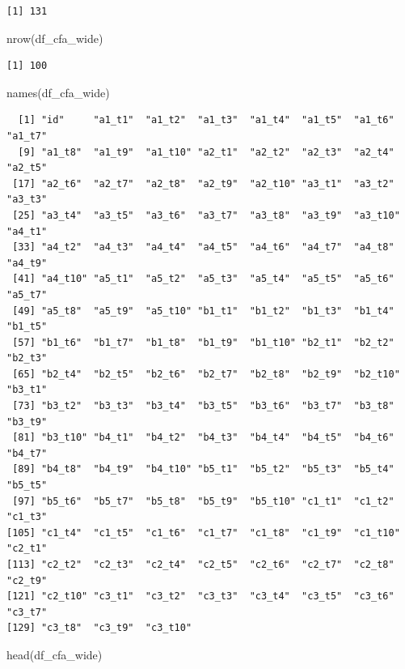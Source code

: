 \documentclass[
  letterpaper,
  DIV=11,
  numbers=noendperiod]{scrreprt}
\newenvironment{Shaded}{\begin{snugshade}}{\end{snugshade}}
\newcommand{\FunctionTok}[1]{\textcolor[rgb]{0.28,0.35,0.67}{#1}}
\newcommand{\NormalTok}[1]{\textcolor[rgb]{0.00,0.23,0.31}{#1}}
\begin{document}
\begin{verbatim}
[1] 131
\end{verbatim}

\begin{Shaded}
\begin{Highlighting}[]
\FunctionTok{nrow}\NormalTok{(df\_cfa\_wide)}
\end{Highlighting}
\end{Shaded}

\begin{verbatim}
[1] 100
\end{verbatim}

\begin{Shaded}
\begin{Highlighting}[]
\FunctionTok{names}\NormalTok{(df\_cfa\_wide)}
\end{Highlighting}
\end{Shaded}

\begin{verbatim}
  [1] "id"     "a1_t1"  "a1_t2"  "a1_t3"  "a1_t4"  "a1_t5"  "a1_t6"  "a1_t7" 
  [9] "a1_t8"  "a1_t9"  "a1_t10" "a2_t1"  "a2_t2"  "a2_t3"  "a2_t4"  "a2_t5" 
 [17] "a2_t6"  "a2_t7"  "a2_t8"  "a2_t9"  "a2_t10" "a3_t1"  "a3_t2"  "a3_t3" 
 [25] "a3_t4"  "a3_t5"  "a3_t6"  "a3_t7"  "a3_t8"  "a3_t9"  "a3_t10" "a4_t1" 
 [33] "a4_t2"  "a4_t3"  "a4_t4"  "a4_t5"  "a4_t6"  "a4_t7"  "a4_t8"  "a4_t9" 
 [41] "a4_t10" "a5_t1"  "a5_t2"  "a5_t3"  "a5_t4"  "a5_t5"  "a5_t6"  "a5_t7" 
 [49] "a5_t8"  "a5_t9"  "a5_t10" "b1_t1"  "b1_t2"  "b1_t3"  "b1_t4"  "b1_t5" 
 [57] "b1_t6"  "b1_t7"  "b1_t8"  "b1_t9"  "b1_t10" "b2_t1"  "b2_t2"  "b2_t3" 
 [65] "b2_t4"  "b2_t5"  "b2_t6"  "b2_t7"  "b2_t8"  "b2_t9"  "b2_t10" "b3_t1" 
 [73] "b3_t2"  "b3_t3"  "b3_t4"  "b3_t5"  "b3_t6"  "b3_t7"  "b3_t8"  "b3_t9" 
 [81] "b3_t10" "b4_t1"  "b4_t2"  "b4_t3"  "b4_t4"  "b4_t5"  "b4_t6"  "b4_t7" 
 [89] "b4_t8"  "b4_t9"  "b4_t10" "b5_t1"  "b5_t2"  "b5_t3"  "b5_t4"  "b5_t5" 
 [97] "b5_t6"  "b5_t7"  "b5_t8"  "b5_t9"  "b5_t10" "c1_t1"  "c1_t2"  "c1_t3" 
[105] "c1_t4"  "c1_t5"  "c1_t6"  "c1_t7"  "c1_t8"  "c1_t9"  "c1_t10" "c2_t1" 
[113] "c2_t2"  "c2_t3"  "c2_t4"  "c2_t5"  "c2_t6"  "c2_t7"  "c2_t8"  "c2_t9" 
[121] "c2_t10" "c3_t1"  "c3_t2"  "c3_t3"  "c3_t4"  "c3_t5"  "c3_t6"  "c3_t7" 
[129] "c3_t8"  "c3_t9"  "c3_t10"
\end{verbatim}

\begin{Shaded}
\begin{Highlighting}[]
\FunctionTok{head}\NormalTok{(df\_cfa\_wide)}
\end{Highlighting}
\end{Shaded}
\end{document}
